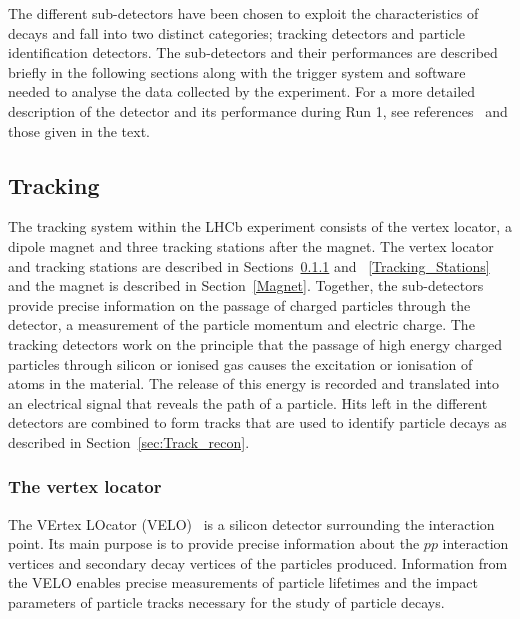 The different sub-detectors have been chosen to exploit the characteristics of \bhadron decays and fall into two distinct categories; tracking detectors and particle identification detectors. The sub-detectors and their performances are described briefly in the following sections along with the trigger system and software needed to analyse the data collected by the experiment. %
For a more detailed description of the detector and its performance during Run 1, see references~\cite{TDR1,Alves:2008zz,LHCb:2003ab,Aaij:2014jba} and those given in the text.




\subsection{Tracking}
\label{Tracking}

The tracking system within the LHCb experiment consists of the vertex locator, a dipole magnet and three tracking stations after the magnet. The vertex locator and tracking stations are described in Sections~\ref{VELO} and ~\ref{Tracking_Stations} and the magnet is described in Section~\ref{Magnet}. Together, the sub-detectors provide precise information on the passage of charged particles through the detector, a measurement of the particle momentum and electric charge. 
The tracking detectors work on the principle that the passage of high energy charged particles through silicon or ionised gas causes the excitation or ionisation of atoms in the material. The release of this energy is recorded and translated into an electrical signal that reveals the path of a particle. 
Hits left in the different detectors are combined to form tracks that are used to identify particle decays as described in Section~\ref{sec:Track_recon}.
\subsubsection{The vertex locator}
\label{VELO}
The VErtex LOcator (VELO)~\cite{Barbosa-Marinho:504321, LHCbVELOGroup:2014uea} is a silicon detector surrounding the interaction point. Its main purpose is to provide precise information about the $pp$ interaction vertices and secondary decay vertices of the particles produced. Information from the VELO enables precise measurements of particle lifetimes and the impact parameters of particle tracks necessary for the study of particle decays. %


